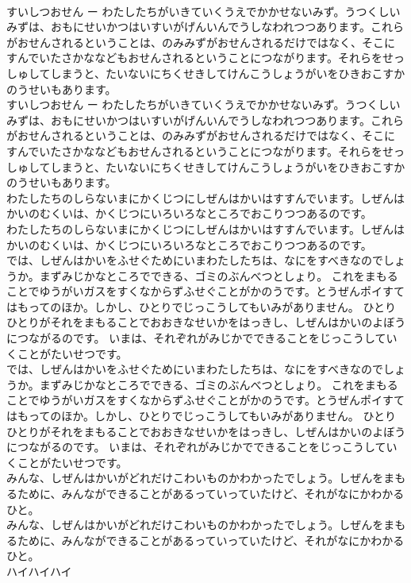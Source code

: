 \documentclass[8pt]{extreport}
\begin{document}
\begin{CJK}{UTF8}{min}
\\	すいしつおせん ー わたしたちがいきていくうえでかかせないみず。うつくしいみずは、おもにせいかつはいすいがげんいんでうしなわれつつあります。これらがおせんされるということは、のみみずがおせんされるだけではなく、そこにすんでいたさかななどもおせんされるということにつながります。それらをせっしゅしてしまうと、たいないにちくせきしてけんこうしょうがいをひきおこすかのうせいもあります。
\\	すいしつおせん ー わたしたちがいきていくうえでかかせないみず。うつくしいみずは、おもにせいかつはいすいがげんいんでうしなわれつつあります。これらがおせんされるということは、のみみずがおせんされるだけではなく、そこにすんでいたさかななどもおせんされるということにつながります。それらをせっしゅしてしまうと、たいないにちくせきしてけんこうしょうがいをひきおこすかのうせいもあります。
\\	わたしたちのしらないまにかくじつにしぜんはかいはすすんでいます。しぜんはかいのむくいは、かくじつにいろいろなところでおこりつつあるのです。
\\	わたしたちのしらないまにかくじつにしぜんはかいはすすんでいます。しぜんはかいのむくいは、かくじつにいろいろなところでおこりつつあるのです。
\\	では、しぜんはかいをふせぐためにいまわたしたちは、なにをすべきなのでしょうか。まずみじかなところでできる、ゴミのぶんべつとしょり。 これをまもることでゆうがいガスをすくなからずふせぐことがかのうです。とうぜんポイすてはもってのほか。しかし、ひとりでじっこうしてもいみがありません。 ひとりひとりがそれをまもることでおおきなせいかをはっきし、しぜんはかいのよぼうにつながるのです。 いまは、それぞれがみじかでできることをじっこうしていくことがたいせつです。
\\	では、しぜんはかいをふせぐためにいまわたしたちは、なにをすべきなのでしょうか。まずみじかなところでできる、ゴミのぶんべつとしょり。 これをまもることでゆうがいガスをすくなからずふせぐことがかのうです。とうぜんポイすてはもってのほか。しかし、ひとりでじっこうしてもいみがありません。 ひとりひとりがそれをまもることでおおきなせいかをはっきし、しぜんはかいのよぼうにつながるのです。 いまは、それぞれがみじかでできることをじっこうしていくことがたいせつです。
\\	みんな、しぜんはかいがどれだけこわいものかわかったでしょう。しぜんをまもるために、みんなができることがあるっていっていたけど、それがなにかわかるひと。
\\	みんな、しぜんはかいがどれだけこわいものかわかったでしょう。しぜんをまもるために、みんなができることがあるっていっていたけど、それがなにかわかるひと。
\\	ハイハイハイ

\end{CJK}
\end{document}
